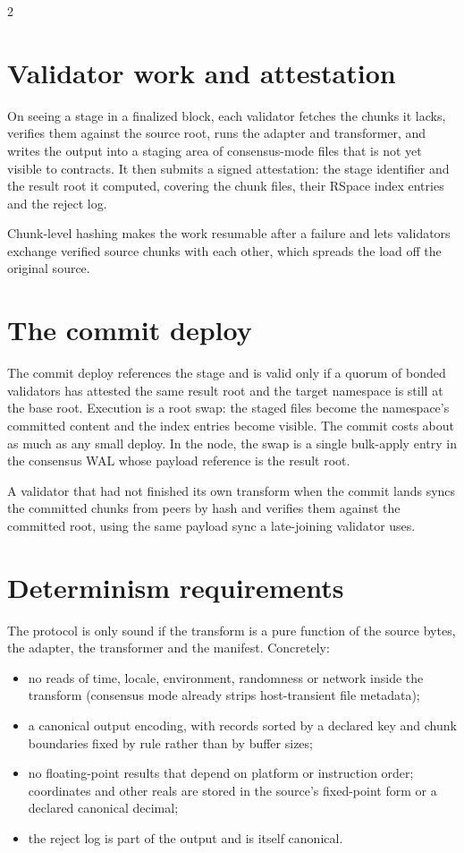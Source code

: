 \documentclass[10pt]{article}
\begin{document}
\begin{multicols}{2}
\section{Validator work and attestation}

On seeing a stage in a finalized block, each validator fetches the chunks it
lacks, verifies them against the source root, runs the adapter and transformer,
and writes the output into a staging area of consensus-mode files that is not yet
visible to contracts. It then submits a signed attestation: the stage identifier
and the result root it computed, covering the chunk files, their RSpace index
entries and the reject log.

Chunk-level hashing makes the work resumable after a failure and lets validators
exchange verified source chunks with each other, which spreads the load off the
original source.

\section{The commit deploy}

The commit deploy references the stage and is valid only if a quorum of bonded
validators has attested the same result root and the target namespace is still at
the base root. Execution is a root swap: the staged files become the namespace's
committed content and the index entries become visible. The commit costs about
as much as any small deploy. In the node, the swap is a single bulk-apply entry
in the consensus WAL whose payload reference is the result root.

A validator that had not finished its own transform when the commit lands syncs
the committed chunks from peers by hash and verifies them against the committed
root, using the same payload sync a late-joining validator uses.

\section{Determinism requirements}

The protocol is only sound if the transform is a pure function of the source
bytes, the adapter, the transformer and the manifest. Concretely:

\begin{itemize}
\item no reads of time, locale, environment, randomness or network inside the
  transform (consensus mode already strips host-transient file metadata);
\item a canonical output encoding, with records sorted by a declared key and
  chunk boundaries fixed by rule rather than by buffer sizes;
\item no floating-point results that depend on platform or instruction order;
  coordinates and other reals are stored in the source's fixed-point form or a
  declared canonical decimal;
\item the reject log is part of the output and is itself canonical.
\end{itemize}


\end{multicols}
\end{document}
